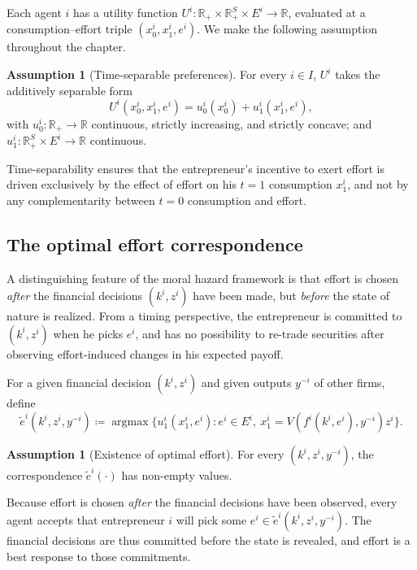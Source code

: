 \documentclass[11pt,a4paper,oneside]{book}
\def\R{\mathbb{R}}
\DeclareMathOperator*{\argmax}{argmax}
\theoremstyle{plain}
\theoremstyle{definition}
\newtheorem{assumption}[theorem]{Assumption}
\theoremstyle{remark}
\numberwithin{equation}{chapter}
\begin{document}
Each agent $i$ has a utility function $U^i : \R_+ \times \R_+^S \times E^i \to \R$, evaluated at a consumption--effort triple $(x^i_0, x^i_1, e^i)$.
We make the following assumption throughout the chapter.

\begin{assumption}[Time-separable preferences]\label{ass:time-sep}
For every $i \in I$, $U^i$ takes the additively separable form
\begin{equation}\label{eq:time-sep}
  U^i(x^i_0, x^i_1, e^i) = u^i_0(x^i_0) + u^i_1(x^i_1, e^i),
\end{equation}
with $u^i_0 : \R_+ \to \R$ continuous, strictly increasing, and strictly concave; and $u^i_1 : \R_+^S \times E^i \to \R$ continuous.
\end{assumption}

Time-separability ensures that the entrepreneur's incentive to exert effort is driven exclusively by the effect of effort on his $t=1$ consumption $x^i_1$, and not by any complementarity between $t=0$ consumption and effort.

\subsection{The optimal effort correspondence}

A distinguishing feature of the moral hazard framework is that effort is chosen \emph{after} the financial decisions $(k^i, z^i)$ have been made, but \emph{before} the state of nature is realized.
From a timing perspective, the entrepreneur is committed to $(k^i, z^i)$ when he picks $e^i$, and has no possibility to re-trade securities after observing effort-induced changes in his expected payoff.

For a given financial decision $(k^i, z^i)$ and given outputs $y^{-i}$ of other firms, define
\begin{equation}\label{eq:opt-effort}
  \widetilde{e}^i(k^i, z^i, y^{-i})
  \coloneqq \argmax \bigl\{ u^i_1(x^i_1, e^i) \colon e^i \in E^i, \ x^i_1 = V(f^i(k^i, e^i), y^{-i}) z^i \bigr\}.
\end{equation}

\begin{assumption}[Existence of optimal effort]\label{ass:opt-effort-exists}
For every $(k^i, z^i, y^{-i})$, the correspondence $\widetilde{e}^i(\cdot)$ has non-empty values.
\end{assumption}

Because effort is chosen \emph{after} the financial decisions have been observed, every agent accepts that entrepreneur $i$ will pick some $e^i \in \widetilde{e}^i(k^i, z^i, y^{-i})$.
The financial decisions are thus committed before the state is revealed, and effort is a best response to those commitments.
\end{document}
